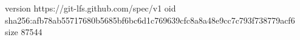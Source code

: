 version https://git-lfs.github.com/spec/v1
oid sha256:afb78ab55717680b5685bf6bc6d1c769639cfc8a8a48e9cc7c793f738779acf6
size 87544
